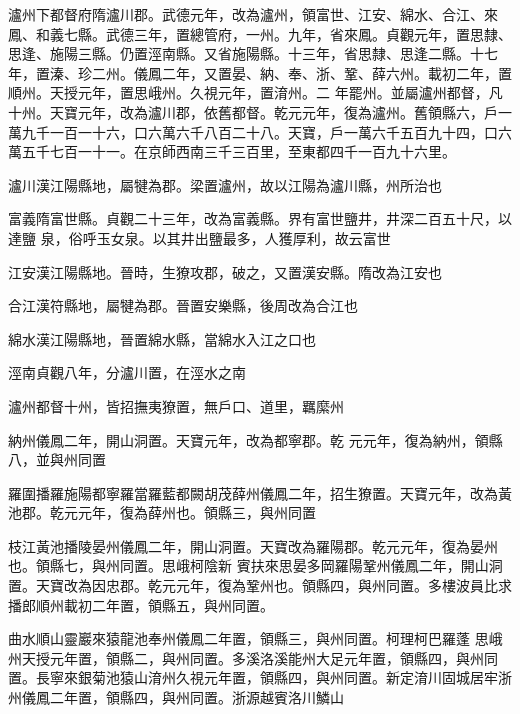 \begin{pinyinscope}
 瀘州下都督府隋瀘川郡。武德元年，改為瀘州，領富世、江安、綿水、合江、來鳳、和義七縣。武德三年，置總管府，一州。九年，省來鳳。貞觀元年，置思隸、思逢、施陽三縣。仍置涇南縣。又省施陽縣。十三年，省思隸、思逢二縣。十七年，置溱、珍二州。儀鳳二年，又置晏、納、奉、浙、鞏、薛六州。載初二年，置順州。天授元年，置思峨州。久視元年，置淯州。二
 年罷州。並屬瀘州都督，凡十州。天寶元年，改為瀘川郡，依舊都督。乾元元年，復為瀘州。舊領縣六，戶一萬九千一百一十六，口六萬六千八百二十八。天寶，戶一萬六千五百九十四，口六萬五千七百一十一。在京師西南三千三百里，至東都四千一百九十六里。



 瀘川漢江陽縣地，屬犍為郡。梁置瀘州，故以江陽為瀘川縣，州所治也



 富義隋富世縣。貞觀二十三年，改為富義縣。界有富世鹽井，井深二百五十尺，以達鹽
 泉，俗呼玉女泉。以其井出鹽最多，人獲厚利，故云富世



 江安漢江陽縣地。晉時，生獠攻郡，破之，又置漢安縣。隋改為江安也



 合江漢符縣地，屬犍為郡。晉置安樂縣，後周改為合江也



 綿水漢江陽縣地，晉置綿水縣，當綿水入江之口也



 涇南貞觀八年，分瀘川置，在涇水之南



 瀘州都督十州，皆招撫夷獠置，無戶口、道里，羈縻州



 納州儀鳳二年，開山洞置。天寶元年，改為都寧郡。乾
 元元年，復為納州，領縣八，並與州同置



 羅圍播羅施陽都寧羅當羅藍都闕胡茂薛州儀鳳二年，招生獠置。天寶元年，改為黃池郡。乾元元年，復為薛州也。領縣三，與州同置



 枝江黃池播陵晏州儀鳳二年，開山洞置。天寶改為羅陽郡。乾元元年，復為晏州也。領縣七，與州同置。思峨柯陰新
 賓扶來思晏多岡羅陽鞏州儀鳳二年，開山洞置。天寶改為因忠郡。乾元元年，復為鞏州也。領縣四，與州同置。多樓波員比求播郎順州載初二年置，領縣五，與州同置。



 曲水順山靈巖來猿龍池奉州儀鳳二年置，領縣三，與州同置。柯理柯巴羅蓬
 思峨州天授元年置，領縣二，與州同置。多溪洛溪能州大足元年置，領縣四，與州同置。長寧來銀菊池猿山淯州久視元年置，領縣四，與州同置。新定淯川固城居牢浙州儀鳳二年置，領縣四，與州同置。浙源越賓洛川鱗山




\end{pinyinscope}
